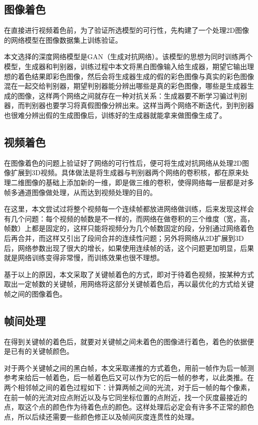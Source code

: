 \subsection{图像着色}
\label{sec:1-image-color}

  在直接进行视频着色前，为了验证所选模型的可行性，先构建了一个处理2D图像的网络模型在图像数据集上训练验证。

  本文选择的深度网络模型是GAN（生成对抗网络）。该模型的思想为同时训练两个模型，生成器和判别器，训练过程中本文将黑白图像输入给生成器，期望它输出理想的着色结果即彩色图像，然后会将生成器生成的假的彩色图像与真实的彩色图像混在一起交给判别器，期望判别器能分辨出哪些是真的彩色图像，哪些是生成器生成的图像，这样两个网络之间就存在一种对抗关系：生成器要不断学习骗过判别器，而判别器也要学习将真假图像分辨出来。这样当两个网络不断迭代，到判别器也很难分辨出假的生成图像后，训练好的生成器就能拿来做图像生成了。

\subsection{视频着色}
\label{sec:1-video-color}

  在图像着色的问题上验证好了网络的可行性后，便可将生成对抗网络从处理2D图像扩展到3D视频。具体做法是将生成器与判别器两个网络的卷积核，都在原来处理二维图像的基础上添加新的一维，即是做三维的卷积，使得网络每一层都是对多帧多通道图像做处理，从而达到视频处理的目的。

  在这里，本文尝试过将整个视频每一个连续帧都放进网络做训练，后来发现这样会有几个问题：每个视频的帧数是不一样的，而网络在做卷积的三个维度（宽，高，帧数）上都是固定的，这样只能将视频分为几个帧数固定的段，分别通过网络着色后再合并，而这样又引出了段间合并的连续性问题；另外将网络从2D扩展到3D后，网络参数出现了很大的增长，如果使用连续帧的话，这个问题更加明显，后果就是网络训练变得非常慢，而训练效果也很不理想。

  基于以上的原因，本文采取了关键帧着色的方式，即对于待着色视频，按某种方式取出一定帧数的关键帧，用网络将这部分关键帧着色后，再以最优化的方式给关键帧之间的图像着色。

\subsection{帧间处理}
\label{sec:1-interframes}

  在得到关键帧的着色后，就要对关键帧之间未着色的图像进行着色，着色的依据便是已有的关键帧颜色。

  对于两个关键帧之间的黑白帧，本文采取递推的方式着色，用前一帧作为后一帧测参考来给后一帧着色，后一帧着色后又可以作为它的后一帧的参考，以此类推。在两个相邻帧之间的着色过程如下：计算两帧之间的光流，对于后一帧的每个像素，在前一帧的光流对应点附近以及与它同坐标位置的点附近，找一个灰度最接近的点，取这个点的颜色作为待着色点的颜色。这样处理后必定会有许多不正常的颜色点，所以后续还需要一些颜色修正以及帧间灰度连贯性的处理。

